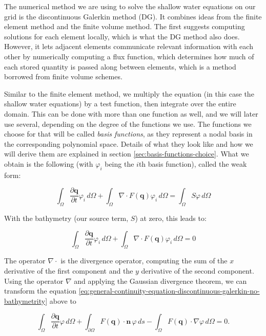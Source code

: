 \documentclass[a4paper, twoside]{article}
\newcommand{\pd}[2]{\dfrac{\partial #1}{\partial #2}}
\renewcommand{\phi}{\varphi}
\begin{document}
The numerical method we are using to solve the shallow water equations on our grid is the discontinuous Galerkin method (DG). It combines ideas from the finite element method and the finite volume method. The first suggests computing solutions for each element locally, which is what the DG method also does. However, it lets adjacent elements communicate relevant information with each other by numerically computing a flux function, which determines how much of each stored quantity is passed along between elements, which is a method borrowed from finite volume schemes.

Similar to the finite element method, we multiply the equation (in this case the shallow water equations) by a test function, then integrate over the entire domain. This can be done with more than one function as well, and we will later use several, depending on the degree of the functions we use. The functions we choose for that will be called \emph{basis functions}, as they represent a nodal basis in the corresponding polynomial space. Details of what they look like and how we will derive them are explained in section \ref{sec:basis-functions-choice}. What we obtain is the following (with $\phi_i$ being the $i$th basis function), called the weak form:

\begin{equation}
  \label{eq:general-continuity-equation-discontinuous-galerkin}
  \int_\Omega \pd{\mathbf{q}}{t} \phi_i \,d\Omega + \int_\Omega \nabla \cdot F(\mathbf{q}) \phi_i \,d\Omega = \int_\Omega S \phi \,d\Omega
\end{equation}

With the bathymetry (our source term, $S$) at zero, this leads to:

\begin{equation}
  \label{eq:general-continuity-equation-discontinuous-galerkin-no-bathymetrity}
  \int_\Omega \pd{\mathbf{q}}{t} \phi_i \,d\Omega + \int_\Omega \nabla \cdot F(\mathbf{q}) \phi_i \,d\Omega = 0
\end{equation}

The operator $\nabla \cdot$ is the divergence operator, computing the sum of the $x$ derivative of the first component and the $y$ derivative of the second component. Using the operator $\nabla$ and applying the Gaussian divergence theorem, we can transform the equation \ref{eq:general-continuity-equation-discontinuous-galerkin-no-bathymetrity} above to

\begin{equation}
  \label{eq:shallow-water-weak-form-div-applied}
  \int_\Omega \pd {\mathbf{q}}{t} \phi \, d\Omega +
  \int_{\partial \Omega} F(\mathbf{q}) \cdot \mathbf{n} \, \phi \, ds -
  \int_\Omega F(\mathbf{q}) \cdot \nabla \phi \, d\Omega = 0.
\end{equation}
\end{document}
